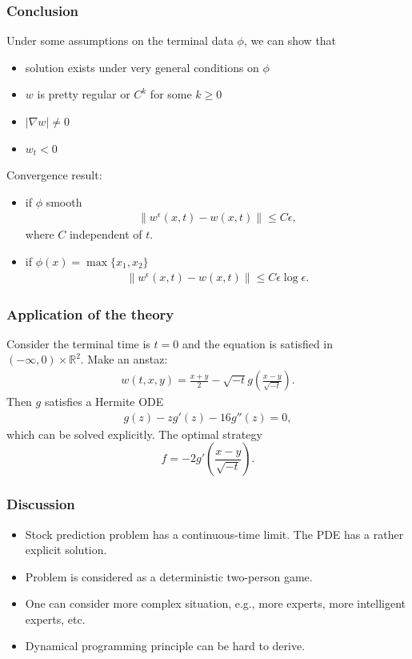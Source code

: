 \documentclass{beamer}
\begin{document}
\begin{frame}
\frametitle{Conclusion}
Under some assumptions on the terminal data $\phi$, we can show that
\begin{itemize}
\item solution exists under very general conditions on $\phi$
\item $w$ is pretty regular or $C^k$ for some $k\ge 0$ 
\item $|\nabla w|\neq 0$
\item $w_t<0$
\end{itemize}
Convergence result:
\begin{itemize}
\item if $\phi$ smooth
\begin{align*}
\|w^\epsilon(x,t)-w(x,t)\|\le C\epsilon,
\end{align*}
where $C$ independent of $t$.
\item if $\phi(x) = \max\{x_1,x_2\}$
\begin{align*}
\|w^\epsilon(x,t)-w(x,t)\|\le C\epsilon\log\epsilon.
\end{align*} 
\end{itemize}
\end{frame}

\begin{frame}
\frametitle{Application of the theory} 
Consider the terminal time is $t = 0$ and the equation is satisfied in $(-\infty,0)\times \mathbb{R}^2$. Make an anstaz:
\begin{align*}
w(t,x,y) = \frac{x+y}{2}-\sqrt{-t}g(\frac{x-y}{\sqrt{-t}}).
\end{align*}
Then $g$ satisfies a Hermite ODE
\begin{align*}
g(z) - zg'(z) - 16g''(z)= 0,
\end{align*}
which can be solved explicitly.
\vfill
The optimal strategy 
$$
f = -2g'(\frac{x-y}{\sqrt{-t}}).
$$
\end{frame}


\begin{frame}
\frametitle{Discussion}
\begin{itemize}
\item Stock prediction problem has a continuous-time limit. The PDE has a rather explicit solution. 
\item Problem is considered as a deterministic two-person game.
\item One can consider more complex situation, e.g., more experts, more intelligent experts, etc.
\item Dynamical programming principle can be hard to derive.
\end{itemize}
\end{frame}
\end{document}
